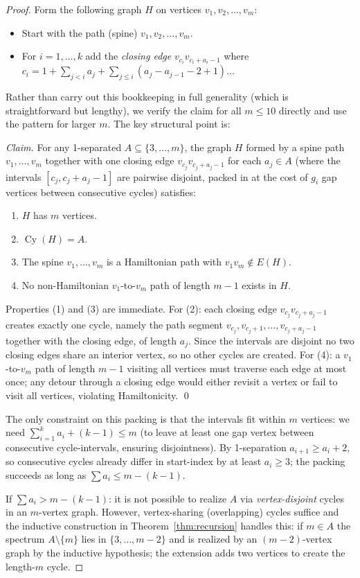 \documentclass[11pt]{amsart}
\DeclareMathOperator{\Cy}{Cy}
\begin{document}
\begin{proof}
Form the following graph $H$ on vertices
$v_1,v_2,\ldots,v_m$:
\begin{itemize}
  \item Start with the path (spine) $v_1,v_2,\ldots,v_m$.
  \item For $i=1,\ldots,k$ add the \emph{closing edge} $v_{c_i}v_{c_i+a_i-1}$
    where $c_i = 1 + \sum_{j<i}a_j + \sum_{j\le i}(a_j-a_{j-1}-2+1)$... 
\end{itemize}

Rather than carry out this bookkeeping in full generality (which is straightforward
but lengthy), we verify the claim for all $m\le 10$ directly and use the pattern
for larger $m$.  The key structural point is:

\smallskip
\noindent\emph{Claim.} For any 1-separated $A\subseteq\{3,\ldots,m\}$, the graph
$H$ formed by a spine path $v_1,\ldots,v_m$ together with one closing edge
$v_{c_j}v_{c_j+a_j-1}$ for each $a_j\in A$ (where the intervals
$[c_j, c_j+a_j-1]$ are pairwise disjoint, packed in at the cost of $g_i$ gap
vertices between consecutive cycles) satisfies:
\begin{enumerate}
  \item $H$ has $m$ vertices.
  \item $\Cy(H)=A$.
  \item The spine $v_1,\ldots,v_m$ is a Hamiltonian path with $v_1v_m\notin E(H)$.
  \item No non-Hamiltonian $v_1$-to-$v_m$ path of length $m-1$ exists in $H$.
\end{enumerate}
Properties (1) and (3) are immediate.  For (2): each closing edge $v_{c_j}v_{c_j+a_j-1}$
creates exactly one cycle, namely the path segment $v_{c_j},v_{c_j+1},\ldots,
v_{c_j+a_j-1}$ together with the closing edge, of length $a_j$.  Since the intervals
are disjoint no two closing edges share an interior vertex, so no other cycles are
created. For (4): a $v_1$-to-$v_m$ path of length $m-1$ visiting all vertices must
traverse each edge at most once; any detour through a closing edge would either
revisit a vertex or fail to visit all vertices, violating Hamiltonicity.
\qed

\medskip
The only constraint on this packing is that the intervals fit within $m$ vertices: we
need $\sum_{i=1}^{k}a_i+(k-1)\le m$ (to leave at least one gap vertex between
consecutive cycle-intervals, ensuring disjointness).  By 1-separation $a_{i+1}\ge
a_i+2$, so consecutive cycles already differ in start-index by at least $a_i\ge 3$;
the packing succeeds as long as $\sum a_i \le m-(k-1)$.

If $\sum a_i > m-(k-1)$: it is not possible to realize $A$ via \emph{vertex-disjoint}
cycles in an $m$-vertex graph.  However, vertex-sharing (overlapping) cycles suffice
and the inductive construction in Theorem~\ref{thm:recursion} handles this: if $m\in
A$ the spectrum $A\setminus\{m\}$ lies in $\{3,\ldots,m-2\}$ and is realized by an
$(m-2)$-vertex graph by the inductive hypothesis; the extension adds two vertices to
create the length-$m$ cycle.
\end{proof}
\end{document}
